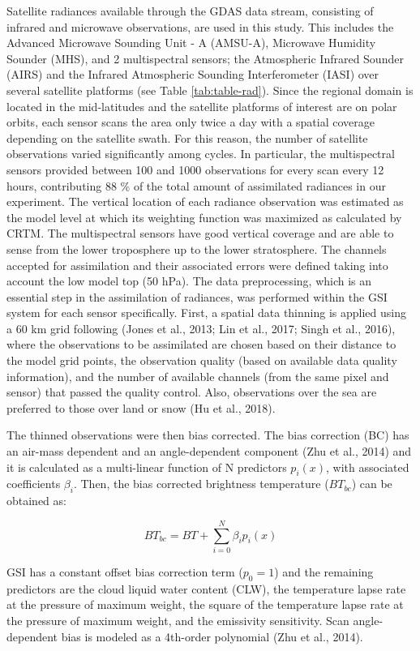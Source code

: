 \documentclass[final,5p,times,twocolumn,authoryear]{elsarticle} %
\begin{document}
Satellite radiances available through the GDAS data stream, consisting of infrared and microwave observations, are used in this study. This includes the Advanced Microwave Sounding Unit - A (AMSU-A), Microwave Humidity Sounder (MHS), and 2 multispectral sensors; the Atmospheric Infrared Sounder (AIRS) and the Infrared Atmospheric Sounding Interferometer (IASI) over several satellite platforms (see Table \ref{tab:table-rad}). Since the regional domain is located in the mid-latitudes and the satellite platforms of interest are on polar orbits, each sensor scans the area only twice a day with a spatial coverage depending on the satellite swath. For this reason, the number of satellite observations varied significantly among cycles. In particular, the multispectral sensors provided between 100 and 1000 observations for every scan every 12 hours, contributing 88 \% of the total amount of assimilated radiances in our experiment. The vertical location of each radiance observation was estimated as the model level at which its weighting function was maximized as calculated by CRTM. The multispectral sensors have good vertical coverage and are able to sense from the lower troposphere up to the lower stratosphere.
The channels accepted for assimilation and their associated errors were defined taking into account the low model top (50 hPa). The data preprocessing, which is an essential step in the assimilation of radiances, was performed within the GSI system for each sensor specifically. First, a spatial data thinning is applied using a 60 km grid following (Jones et al., 2013; Lin et al., 2017; Singh et al., 2016), where the observations to be assimilated are chosen based on their distance to the model grid points, the observation quality (based on available data quality information), and the number of available channels (from the same pixel and sensor) that passed the quality control. Also, observations over the sea are preferred to those over land or snow (Hu et al., 2018).

The thinned observations were then bias corrected. The bias correction (BC) has an air-mass dependent and an angle-dependent component (Zhu et al., 2014) and it is calculated as a multi-linear function of N predictors \(p_i(x)\), with associated coefficients \(\beta_i\). Then, the bias corrected brightness temperature (\(BT_{bc}\)) can be obtained as:

\[\mathit{BT_{bc}} =\mathit{ BT} + \sum_{i = 0}^{N} \beta_i p_i (x)\]

GSI has a constant offset bias correction term (\(p_0 = 1\)) and the remaining predictors are the cloud liquid water content (CLW), the temperature lapse rate at the pressure of maximum weight, the square of the temperature lapse rate at the pressure of maximum weight, and the emissivity sensitivity. Scan angle-dependent bias is modeled as a 4th-order polynomial (Zhu et al., 2014).
\end{document}
